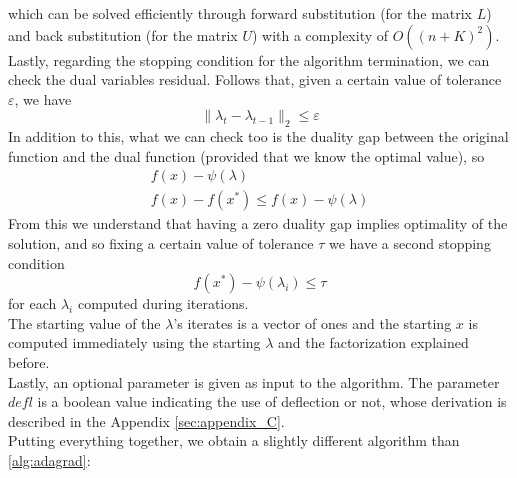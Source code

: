 \documentclass[notitlepage]{article}
\begin{document}
which can be solved efficiently through forward substitution (for the matrix $L$) and back substitution (for the matrix $U$) with a complexity of $O((n+K)^2)$.\\
Lastly, regarding the stopping condition for the algorithm termination, we can check the dual variables residual. Follows that, given a certain value of tolerance $\varepsilon$, we have %
\begin{equation}
    \|\lambda_{t} - \lambda_{t-1}\|_2 \le \varepsilon
  \label{eqn:stopping-condition}
\end{equation}
In addition to this, what we can check too is the duality gap between the original function and the dual function (provided that we know the optimal value), so
\begin{equation}
  \begin{gathered}
    f(x) - \psi(\lambda) \\
    f(x) - f(x^*) \le f(x) - \psi(\lambda)
    \label{eqn:dual-stopcondition}
  \end{gathered}
\end{equation}
From this we understand that having a zero duality gap implies optimality of the solution, and so fixing a certain value of tolerance $\tau$ we have a second stopping condition
\[
  f(x^*) - \psi(\lambda_i) \le \tau  
\] 
for each $\lambda_i$ computed during iterations.\\
The starting value of the $\lambda$'s iterates is a vector of ones and the starting $x$ is computed immediately using the starting $\lambda$ and the factorization explained before.\\
Lastly, an optional parameter is given as input to the algorithm. The parameter $defl$ is a boolean value indicating the use of deflection or not, whose derivation is described in the Appendix \ref{sec:appendix_C}.\\
Putting everything together, we obtain a slightly different algorithm than \ref{alg:adagrad}:
\end{document}
